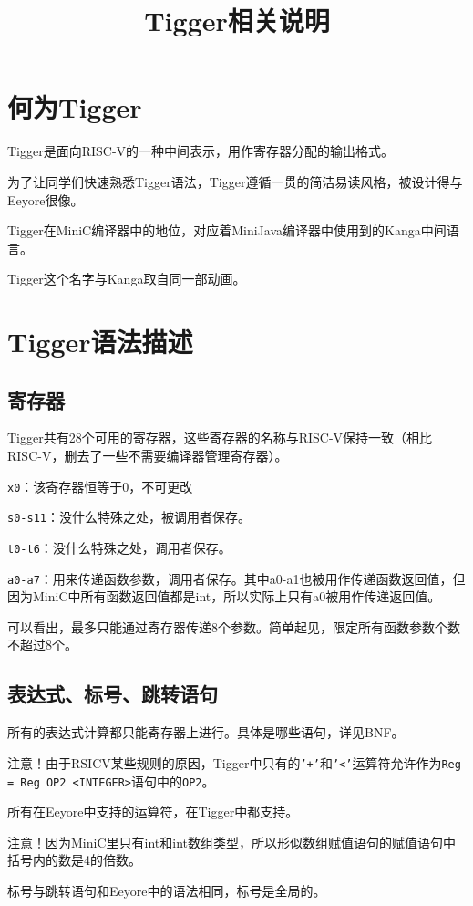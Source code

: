 \documentclass{ctexart}
\title{Tigger相关说明}
\date{}
\author{}
\begin{document}
\maketitle
\section{何为Tigger}
Tigger是面向RISC-V的一种中间表示，用作寄存器分配的输出格式。

为了让同学们快速熟悉Tigger语法，Tigger遵循一贯的简洁易读风格，被设计得与Eeyore很像。

Tigger在MiniC编译器中的地位，对应着MiniJava编译器中使用到的Kanga中间语言。

Tigger这个名字与Kanga取自同一部动画。

\section{Tigger语法描述}
\subsection{寄存器}
Tigger共有28个可用的寄存器，这些寄存器的名称与RISC-V保持一致（相比RISC-V，删去了一些不需要编译器管理寄存器）。

\texttt{x0}：该寄存器恒等于0，不可更改

\texttt{s0-s11}：没什么特殊之处，被调用者保存。

\texttt{t0-t6}：没什么特殊之处，调用者保存。

\texttt{a0-a7}：用来传递函数参数，调用者保存。其中a0-a1也被用作传递函数返回值，但因为MiniC中所有函数返回值都是int，所以实际上只有a0被用作传递返回值。

可以看出，最多只能通过寄存器传递8个参数。简单起见，限定所有函数参数个数不超过8个。

\subsection{表达式、标号、跳转语句}
所有的表达式计算都只能寄存器上进行。具体是哪些语句，详见BNF。

注意！由于RSICV某些规则的原因，Tigger中只有的\texttt{'+'}和\texttt{'<'}运算符允许作为\texttt{Reg = Reg OP2 <INTEGER>}语句中的\texttt{OP2}。

所有在Eeyore中支持的运算符，在Tigger中都支持。

注意！因为MiniC里只有int和int数组类型，所以形似数组赋值语句的赋值语句中括号内的数是4的倍数。

标号与跳转语句和Eeyore中的语法相同，标号是全局的。
\end{document}
